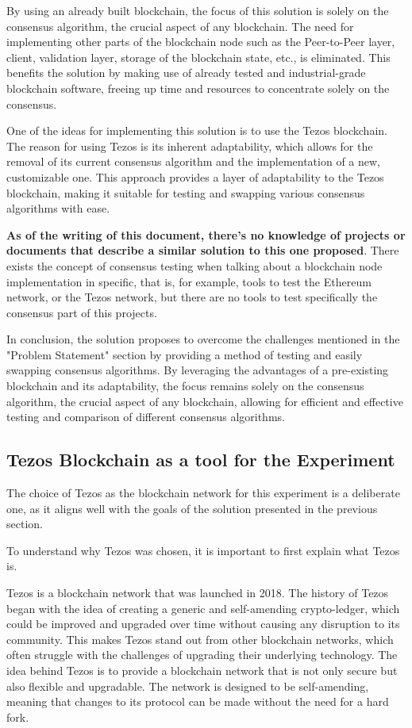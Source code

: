 By using an already built blockchain, the focus of this solution is solely on the consensus algorithm, the crucial aspect of any blockchain. The need for implementing other parts of the blockchain node such as the Peer-to-Peer layer, client, validation layer, storage of the blockchain state, etc., is eliminated. This benefits the solution by making use of already tested and industrial-grade blockchain software, freeing up time and resources to concentrate solely on the consensus.

One of the ideas for implementing this solution is to use the Tezos blockchain. The reason for using Tezos is its inherent adaptability, which allows for the removal of its current consensus algorithm and the implementation of a new, customizable one. This approach provides a layer of adaptability to the Tezos blockchain, making it suitable for testing and swapping various consensus algorithms with ease.

\textbf{As of the writing of this document, there's no knowledge of projects or documents that describe a similar solution to this one proposed}. There exists the concept of consensus testing when talking about a blockchain node implementation in specific, that is, for example, tools to test the Ethereum network, or the Tezos network, but there are no tools to test specifically the consensus part of this projects.

In conclusion, the solution proposes to overcome the challenges mentioned in the "Problem Statement" section by providing a method of testing and easily swapping consensus algorithms. By leveraging the advantages of a pre-existing blockchain and its adaptability, the focus remains solely on the consensus algorithm, the crucial aspect of any blockchain, allowing for efficient and effective testing and comparison of different consensus algorithms.


\subsection*{Tezos Blockchain as a tool for the Experiment}
The choice of Tezos as the blockchain network for this experiment is a deliberate one, as it aligns well with the goals of the solution presented in the previous section.



To understand why Tezos was chosen, it is important to first explain what Tezos is. 

Tezos is a blockchain network that was launched in 2018. The history of Tezos began with the idea of creating a generic and self-amending crypto-ledger, which could be improved and upgraded over time without causing any disruption to its community. This makes Tezos stand out from other blockchain networks, which often struggle with the challenges of upgrading their underlying technology. The idea behind Tezos is to provide a blockchain network that is not only secure but also flexible and upgradable. The network is designed to be self-amending, meaning that changes to its protocol can be made without the need for a hard fork.

